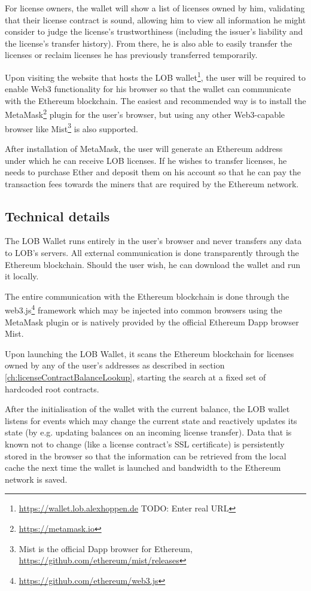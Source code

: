\documentclass[a4paper]{article}
\newcommand{\todo}[1]{\textsf{TODO: #1}}
\begin{document}
For license owners, the wallet will show a list of licenses owned by him, validating that their license contract is sound, allowing him to view all information he might consider to judge the license's trustworthiness (including the issuer's liability and the license's transfer history). From there, he is also able to easily transfer the licenses or reclaim licenses he has previously transferred temporarily.

Upon visiting the website that hosts the LOB wallet\footnote{\url{https://wallet.lob.alexhoppen.de} \todo{Enter real URL}}, the user will be required to enable Web3 functionality for his browser so that the wallet can communicate with the Ethereum blockchain. The easiest and recommended way is to install the MetaMask\footnote{\url{https://metamask.io}} plugin for the user's browser, but using any other Web3-capable browser like Mist\footnote{Mist is the official Dapp browser for Ethereum, \url{https://github.com/ethereum/mist/releases}} is also supported.

After installation of MetaMask, the user will generate an Ethereum address under which he can receive LOB licenses. If he wishes to transfer licenses, he needs to purchase Ether and deposit them on his account so that he can pay the transaction fees towards the miners that are required by the Ethereum network.

\subsection{Technical details}

The LOB Wallet runs entirely in the user's browser and never transfers any data to LOB's servers. All external communication is done transparently through the Ethereum blockchain. Should the user wish, he can download the wallet and run it locally.

The entire communication with the Ethereum blockchain is done through the web3.js\footnote{\url{https://github.com/ethereum/web3.js}} framework which may be injected into common browsers using the MetaMask plugin or is natively provided by the official Ethereum Dapp browser Mist.

Upon launching the LOB Wallet, it scans the Ethereum blockchain for licenses owned by any of the user's addresses as described in section \ref{ch:licenseContractBalanceLookup}, starting the search at a fixed set of hardcoded root contracts.

After the initialisation of the wallet with the current balance, the LOB wallet listens for events which may change the current state and reactively updates its state (by e.g. updating balances on an incoming license transfer). Data that is known not to change (like a license contract's SSL certificate) is persistently stored in the browser so that the information can be retrieved from the local cache the next time the wallet is launched and bandwidth to the Ethereum network is saved.
\end{document}
